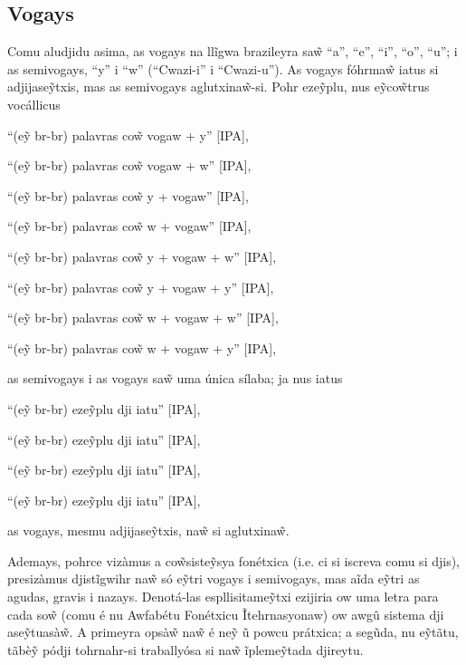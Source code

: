 \documentclass[12pt, a5paper, titlepage]{article}
\begin{document}
\begin{bilingualpages}
    \section{Vogays}
    Comu aludjidu asima, as vogays na llĩgwa brazileyra sa\~w ``a'', ``e'', ``i'',
    ``o'', ``u''; i as semivogays, ``y'' i ``w'' (``Cwazi-i'' i ``Cwazi-u''). As
    vogays fóhrma\~w iatus si adjijase\~ytxis, mas as semivogays aglutxina\~w-si. Pohr eze\~yplu, nus e\~yco\~wtrus vocállicus
    \newline
    \par ``(e\~y br-br) palavras co\~w vogaw + y'' {[IPA]},
    \par ``(e\~y br-br) palavras co\~w vogaw + w'' {[IPA]},
    \par ``(e\~y br-br) palavras co\~w y + vogaw'' {[IPA]},
    \par ``(e\~y br-br) palavras co\~w w + vogaw'' {[IPA]},
    \par ``(e\~y br-br) palavras co\~w y + vogaw + w'' {[IPA]},
    \par ``(e\~y br-br) palavras co\~w y + vogaw + y'' {[IPA]},
    \par ``(e\~y br-br) palavras co\~w w + vogaw + w'' {[IPA]},
    \par ``(e\~y br-br) palavras co\~w w + vogaw + y'' {[IPA]},
    \newline

    as semivogays i as vogays sa\~w uma única sílaba; ja nus iatus
    \newline
    \par ``(e\~y br-br) eze\~yplu dji iatu'' [IPA],
    \par ``(e\~y br-br) eze\~yplu dji iatu'' [IPA],
    \par ``(e\~y br-br) eze\~yplu dji iatu'' [IPA],
    \par ``(e\~y br-br) eze\~yplu dji iatu'' [IPA],
    \newline

    as vogays, mesmu adjijase\~ytxis, na\~w si aglutxina\~w.

    Ademays, pohrce vizàmus a co\~wsiste\~ysya fonétxica (i.e. ci si iscreva comu
    si djis), presizàmus djistĩgwihr na\~w só e\~ytri vogays i semivogays, mas aĩda
    e\~ytri as agudas, gravis i nazays. Denotá-las espllisitame\~ytxi ezijiria ow
    uma letra para cada so\~w (comu é nu Awfabétu Fonétxicu Ĩtehrnasyonaw) ow awgû
    sistema dji ase\~ytuasà\~w. A primeyra opsà\~w na\~w é ne\~y ũ powcu prátxica;
    a segũda, nu e\~ytãtu, tãbè\~y pódji tohrnahr-si traballyósa si na\~w
    ĩpleme\~ytada djireytu.


\end{bilingualpages}
\end{document}
